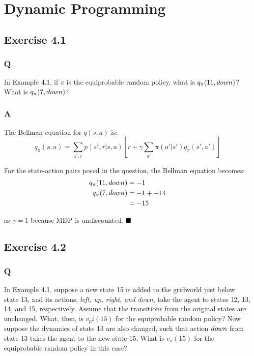 \section{Dynamic Programming}

\subsection{Exercise 4.1}
\subsubsection{Q}
In Example 4.1, if $\pi$ is the equiprobable random policy, what is $q_\pi(11, \mathnormal{down})$? What is $q_\pi(7, \mathnormal{down})$? 
\subsubsection{A}
The Bellman equation for $q(s,a)$ is:
\begin{equation}
q_\pi(s,a) = \sum_{s',r} p(s', r | s, a) \left[r + \gamma \sum_{a'} \pi(a' | s') q_\pi(s', a')\right]
\end{equation}

For the state-action pairs posed in the question, the Bellman equation becomes:
\begin{align}
q_\pi(11, \mathnormal{down}) &= -1 \\
q_\pi(7, \mathnormal{down}) &= -1 + -14 \\
&= -15 \\
\end{align}

as $\gamma = 1$ because MDP is undiscounted.
$
\hfill \blacksquare
$

\subsection{Exercise 4.2}
\subsubsection{Q}
In Example 4.1, suppose a new state 15 is added to the gridworld just below state 13, and its actions, \textit{left, up, right, and down}, take the agent to states 12, 13, 14, and 15, respectively. Assume that the transitions from the original states are unchanged. What, then, is $v_pi(15)$ for the equiprobable random policy? Now suppose the dynamics of state 13 are also changed, such that action $\mathnormal{down}$ from state 13 takes the agent to the new state 15. What is $v_\pi(15)$ for the equiprobable random policy in this case?
